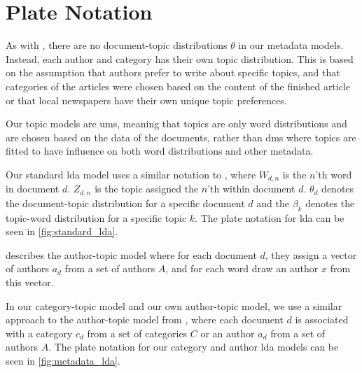 \section{Plate Notation}
As with \citet{author_topic_2012}, there are no document-topic distributions $\theta$ in our metadata models.
Instead, each author and category has their own topic distribution.
This is based on the assumption that authors prefer to write about specific topics, and that categories of the articles were chosen based on the content of the finished article or that local newspapers have their own unique topic preferences.

Our topic models are \glspl{um}, meaning that topics are only word distributions and are chosen based on the data of the documents, rather than \glspl{dm} where topics are fitted to have influence on both word distributions and other metadata.

Our standard \gls{lda} model uses a similar notation to \citet{blei2003latent}, where $W_{d,n}$ is the $n$'th word in document $d$.
$Z_{d,n}$ is the topic assigned the $n$'th within document $d$.
$\theta_d$ denotes the document-topic distribution for a specific document $d$ and the $\beta_k$ denotes the topic-word distribution for a specific topic $k$.
The plate notation for \gls{lda} can be seen in \autoref{fig:standard_lda}.

\citet{author_topic_2012} describes the author-topic model where for each document $d$, they assign a vector of authors $a_d$ from a set of authors $A$, and for each word draw an author $x$ from this vector.

In our category-topic model and our own author-topic model, we use a similar approach to the author-topic model from \citeauthor{author_topic_2012}, where each document $d$ is associated with a category $c_d$ from a set of categories $C$ or an author $a_d$ from a set of authors $A$.
The plate notation for our category and author \gls{lda} models can be seen in \autoref{fig:metadata_lda}.


